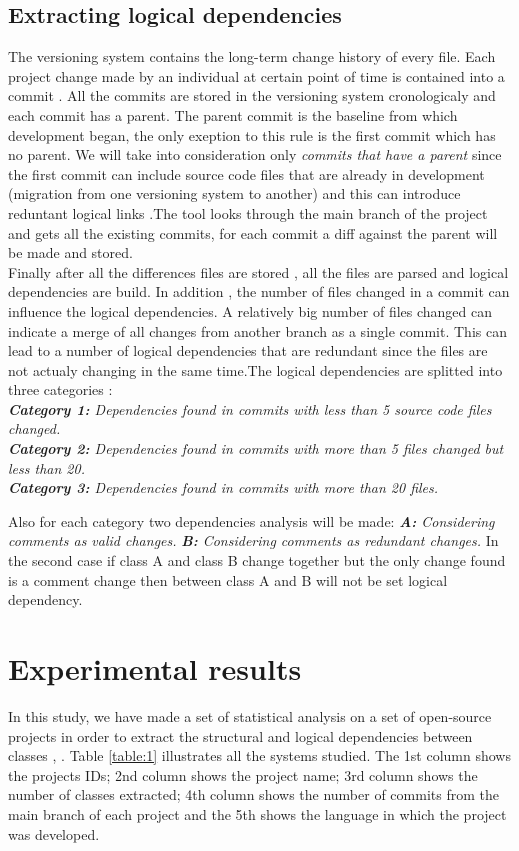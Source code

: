 \documentclass[conference,compsoc]{IEEEtran}
\begin{document}
\subsection{Extracting logical dependencies}
The versioning system contains the long-term change history of every file. Each project change made by an individual at certain point of time is contained into a commit \cite{ct7}. All the commits are stored in the versioning system cronologicaly and each commit has a parent. The parent commit is the baseline from which development began, the only exeption to this rule is the first commit which has no parent. We will take into consideration only \textit{commits that have a parent} since the first commit can include source code files that are already in development (migration from one versioning system to another) and this can introduce reduntant logical links \cite{ct8} .The tool looks through the main branch of the project and gets all the existing commits, for each commit a diff against the parent will be made and stored.\\ Finally after all the differences files are stored , all the files are parsed and logical dependencies are build. In addition , the number of files changed in a commit can influence the logical dependencies. A relatively big number of files changed can indicate a merge of all changes from another branch as a single commit. This can lead to a number of logical dependencies that are redundant since the files are not actualy changing in the same time.The logical dependencies are splitted into three categories :\\
\textit{\textbf{Category 1:} Dependencies found in commits with less than 5 source code files changed.}\\
\textit{\textbf{Category 2:} Dependencies found in commits with more than 5 files changed but less than 20. }\\
\textit{\textbf{Category 3:} Dependencies found in commits with more than 20 files.}

Also for each category two dependencies analysis will be made:
\textit{\textbf{A:} Considering comments  as valid changes.}
\textit{\textbf{B:} Considering comments  as redundant changes. }
In the second case if class A and class B change together but the only change found is a comment change then between class A and B will not be set logical dependency.

\section{Experimental results}
In this study, we have made a set of statistical analysis on a set of open-source projects in order to extract the structural and logical dependencies between classes \cite{ct5}, \cite{ct8} . Table \ref{table:1} illustrates all the systems studied. The 1st column shows the projects IDs; 2nd column shows the project name; 3rd column shows the number of classes extracted; 4th column shows the number of commits from the main branch of each project and the 5th shows the language in which the project was developed.
\end{document}
